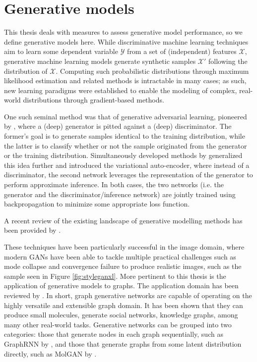 \section{Generative models}\label{genmodels}

This thesis deals with measures to assess generative model performance, so we
define generative models here. While discriminative machine learning techniques
aim to learn some dependent variable $\mathcal{Y}$ from a set of (independent)
features $\mathcal{X}$, generative machine learning models generate synthetic
samples $\mathcal{X}'$ following the distribution of $\mathcal{X}$. Computing
such probabilistic distributions through maximum likelihood estimation and
related methods is intractable in many cases; as such, new learning paradigms
were established to enable the modeling of complex, real-world distributions
through gradient-based methods.

One such seminal method was that of generative adversarial learning, pioneered
by \cite{goodfellow2014generative}, where a (deep) generator is pitted against
a (deep) discriminator. The former's goal is to generate samples identical to
the training distribution, while the latter is to classify whether or not the
sample originated from the generator or the training distribution.
Simultaneously developed methods by \cite{kingma2013auto} generalized this idea
further and introduced the variational auto-encoder, where instead of a
discriminator, the second network leverages the representation of the generator
to perform approximate inference. In both cases, the two networks (i.e. the
generator and the discriminator/inference network) are jointly trained using
backpropagation to minimize some appropriate loss function.

A recent review of the existing landscape of generative modelling methods has
been provided by \cite{bond2021deep}.

These techniques have been particularly successful in the image domain, where
modern GANs have been able to tackle multiple practical challenges such as mode
collapse and convergence failure to produce realistic images, such as the sample
seen in Figure \ref{fig:styleganxl}. More pertinent to this thesis is the
application of generative models to graphs. The application domain has been
reviewed by \cite{zhou2020graph}. In short, graph generative networks are
capable of operating on the highly versatile and extensible graph domain. It has
been shown that they can produce small molecules, generate social networks,
knowledge graphs, among many other real-world tasks. Generative networks can be
grouped into two categories: those that generate nodes in each graph
sequentially, such as GraphRNN by \cite{you2018graphrnn}, and those that generate
graphs from some latent distribution directly, such as MolGAN by
\cite{de2018molgan}.

